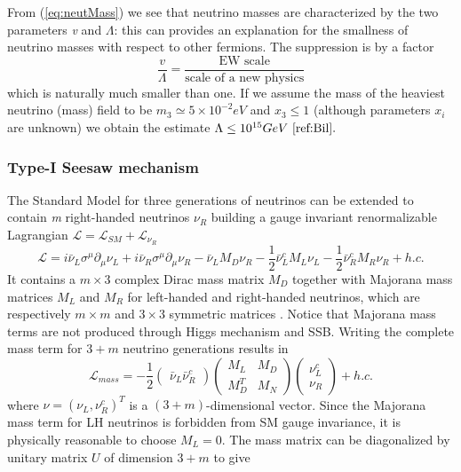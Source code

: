 \documentclass{subnucbo}
\begin{document}
From (\ref{eq:neutMass}) we see that neutrino masses are characterized by the two parameters \emph{v} and $\Lambda$: this can  provides an explanation for the smallness of neutrino masses with respect to other fermions. The suppression is by a factor
\begin{equation}
\frac{v}{\Lambda}=\frac{\text{EW scale}}{\text{scale of a new physics}}
\end{equation}
which is naturally much smaller than one.
If we assume the mass of the heaviest neutrino (mass) field to be $m_3\simeq5\times10^{-2}eV$ and $x_3\leq1$ (although parameters $x_i$ are unknown) we obtain the estimate $\Lambda\leq10^{15}GeV~\cite{ref:Bil}.$

\subsubsection{Type-I Seesaw mechanism}
The Standard Model for three generations of neutrinos can be extended to contain \emph{m} right-handed neutrinos $\nu_R$ building a gauge invariant renormalizable Lagrangian $\mathcal{L}=\mathcal{L}_{SM}+\mathcal{L}_{\nu_R}$ 
\begin{equation}
\label{eq:renormLag}
\mathcal{L}=i\bar{\nu}_L\sigma^{\mu}\partial_{\mu}\nu_L+i\bar{\nu}_R\sigma^{\mu}\partial_{\mu}\nu_R-\bar{\nu}_LM_D\nu_R-\frac{1}{2}\bar{\nu}^c_LM_L\nu_L-\frac{1}{2}\bar{\nu}_R^cM_R\nu_R+h.c.
\end{equation}
It contains a $m\times3$ complex Dirac mass matrix $M_D$ together with Majorana mass matrices $M_L$ and $M_R$ for left-handed and right-handed neutrinos, which are respectively $m\times m$ and $3\times3$ symmetric matrices \cite{ref:Fuji}. 
Notice that Majorana mass terms are not produced through Higgs mechanism and SSB.
Writing the complete mass term for $3+m$ neutrino generations results in 
\begin{equation}
\mathcal{L}_{mass}=-\frac{1}{2}\begin{pmatrix}\bar{\nu}_L \bar{\nu}_R^c\end{pmatrix}\begin{pmatrix}M_L & M_D\\ M_D^T & M_N\end{pmatrix}\begin{pmatrix}\nu_L^c\\ \nu_R\end{pmatrix}+h.c.
\end{equation}
where $\nu=(\nu_L, \nu_R^c)^T$ is a $(3+m)$-dimensional vector. Since the Majorana mass term for LH neutrinos is forbidden from SM gauge invariance, it is physically reasonable to choose $M_L=0$. The mass matrix can be diagonalized by unitary matrix $U$ of dimension $3+m$ to give 
\end{document}
